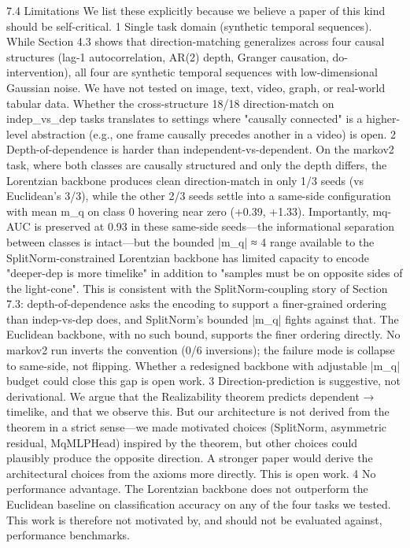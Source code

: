 7.4 Limitations
We list these explicitly because we believe a paper of this kind should be self-critical.
	1	Single task domain (synthetic temporal sequences). While Section 4.3 shows that direction-matching generalizes across four causal structures (lag-1 autocorrelation, AR(2) depth, Granger causation, do-intervention), all four are synthetic temporal sequences with low-dimensional Gaussian noise. We have not tested on image, text, video, graph, or real-world tabular data. Whether the cross-structure 18/18 direction-match on indep_vs_dep tasks translates to settings where "causally connected" is a higher-level abstraction (e.g., one frame causally precedes another in a video) is open.
	2	Depth-of-dependence is harder than independent-vs-dependent. On the markov2 task, where both classes are causally structured and only the depth differs, the Lorentzian backbone produces clean direction-match in only 1/3 seeds (vs Euclidean's 3/3), while the other 2/3 seeds settle into a same-side configuration with mean m_q on class 0 hovering near zero (+0.39, +1.33). Importantly, mq-AUC is preserved at 0.93 in these same-side seeds—the informational separation between classes is intact—but the bounded |m_q| ≈ 4 range available to the SplitNorm-constrained Lorentzian backbone has limited capacity to encode "deeper-dep is more timelike" in addition to "samples must be on opposite sides of the light-cone". This is consistent with the SplitNorm-coupling story of Section 7.3: depth-of-dependence asks the encoding to support a finer-grained ordering than indep-vs-dep does, and SplitNorm's bounded |m_q| fights against that. The Euclidean backbone, with no such bound, supports the finer ordering directly. No markov2 run inverts the convention (0/6 inversions); the failure mode is collapse to same-side, not flipping. Whether a redesigned backbone with adjustable |m_q| budget could close this gap is open work.
	3	Direction-prediction is suggestive, not derivational. We argue that the Realizability theorem predicts dependent → timelike, and that we observe this. But our architecture is not derived from the theorem in a strict sense—we made motivated choices (SplitNorm, asymmetric residual, MqMLPHead) inspired by the theorem, but other choices could plausibly produce the opposite direction. A stronger paper would derive the architectural choices from the axioms more directly. This is open work.
	4	No performance advantage. The Lorentzian backbone does not outperform the Euclidean baseline on classification accuracy on any of the four tasks we tested. This work is therefore not motivated by, and should not be evaluated against, performance benchmarks.

